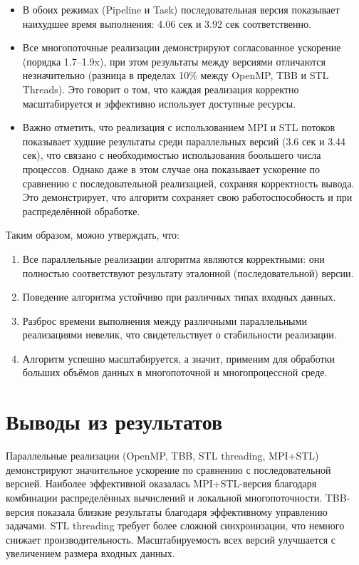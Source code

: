 \documentclass[a4paper,12pt]{article}
\begin{document}
\begin{itemize}
\item В обоих режимах (Pipeline и Task) последовательная версия показывает наихудшее время выполнения: 4.06 сек и 3.92 сек соответственно.
\item Все многопоточные реализации демонстрируют согласованное ускорение (порядка 1.7–1.9x), при этом результаты между версиями отличаются незначительно (разница в пределах 10\% между OpenMP, TBB и STL Threads). Это говорит о том, что каждая реализация корректно масштабируется и эффективно использует доступные ресурсы.
\item Важно отметить, что реализация с использованием MPI и STL потоков показывает худшие результаты среди параллельных версий (3.6 сек и 3.44 сек), что связано с необходимостью использования боольшего числа процессов. Однако даже в этом случае она показывает ускорение по сравнению с последовательной реализацией, сохраняя корректность вывода. Это демонстрирует, что алгоритм сохраняет свою работоспособность и при распределённой обработке.
\end{itemize}

Таким образом, можно утверждать, что:

\begin{enumerate}
\item Все параллельные реализации алгоритма являются корректными: они полностью соответствуют результату эталонной (последовательной) версии.
\item Поведение алгоритма устойчиво при различных типах входных данных.
\item Разброс времени выполнения между различными параллельными реализациями невелик, что свидетельствует о стабильности реализации.
\item Алгоритм успешно масштабируется, а значит, применим для обработки больших объёмов данных в многопоточной и многопроцессной среде.
\end{enumerate}

\section{Выводы из результатов}
Параллельные реализации (OpenMP, TBB, STL threading, MPI+STL) демонстрируют значительное ускорение по сравнению с последовательной версией. Наиболее эффективной оказалась MPI+STL-версия благодаря комбинации распределённых вычислений и локальной многопоточности. TBB-версия показала близкие результаты благодаря эффективному управлению задачами. STL threading требует более сложной синхронизации, что немного снижает производительность. Масштабируемость всех версий улучшается с увеличением размера входных данных.
\end{document}
